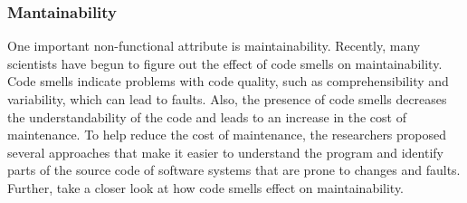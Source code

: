 \documentclass{sigchi}
\begin{document}
\subsubsection{Mantainability}
One important non-functional attribute is maintainability. Recently, many scientists have begun to figure out the effect of code smells on maintainability. Code smells indicate problems with code quality, such as comprehensibility and variability, which can lead to faults. Also, the presence of code smells decreases the understandability of the code and leads to an increase in the cost of maintenance. To help reduce the cost of maintenance, the researchers proposed several approaches that make it easier to understand the program and identify parts of the source code of software systems that are prone to changes and faults. Further, take a closer look at how code smells effect on maintainability. 
\end{document}
